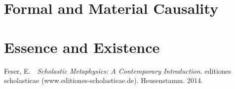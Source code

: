 \documentclass{article}
\begin{document}
\section{Formal and Material Causality}

\section{Essence and Existence}



\begin{thebibliography}{}

Feser, E.\ \ {\it Scholastic Metaphysics: A Contemporary Introduction.}
      editiones scholasticae (www.editiones-scholasticae.de). Heusenstamm.
      2014.

\end{thebibliography}
\end{document}
